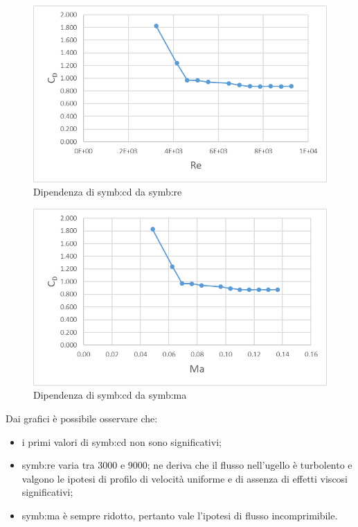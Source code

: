 \begin{figure} [H]
	\centering
	\includegraphics[width=0.5\linewidth]{chapters/5-laboratorio/dipendenzaRe}
	\caption{Dipendenza di \gls{symb:cd} da \gls{symb:re}}
	\label{fig:dipendenzare}
\end{figure}
\begin{figure} [H]
	\centering
	\includegraphics[width=0.5\linewidth]{chapters/5-laboratorio/dipendenzama}
	\caption{Dipendenza di \gls{symb:cd} da \gls{symb:ma}}
	\label{fig:dipendenzama}
\end{figure}

Dai grafici è possibile osservare che: 
\begin{itemize}
	\item i primi valori di \gls{symb:cd} non sono significativi;
	\item \gls{symb:re} varia tra 3000 e 9000; ne deriva che il flusso nell'ugello è turbolento e valgono le ipotesi di profilo di velocità uniforme e di assenza di effetti viscosi significativi;
	\item \gls{symb:ma} è sempre ridotto, pertanto vale l'ipotesi di flusso incomprimibile.
\end{itemize}
